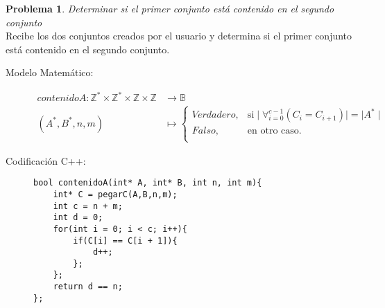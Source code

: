 \documentclass{article}
\theoremstyle{plain}
\theoremstyle{definition}
\newtheorem{problem}{Problema}
\begin{document}
\begin{problem}\emph{Determinar si el primer conjunto está contenido en el segundo conjunto}\\
Recibe los dos conjuntos creados por el usuario y determina si el primer conjunto está contenido en el segundo conjunto.
%
\begin{description}
\item[Modelo Matemático:]
%
\begin{align*}
contenidoA: \mathbb{Z}^*\times\mathbb{Z}^*\times\mathbb{Z}\times\mathbb{Z}&\to \mathbb{B}\\
(A^*,B^*,n,m) &\mapsto
\begin{cases}
Verdadero, &\text{si}\mid \forall_{i=0}^{c-1} (C_i = C_{i+1}) \mid=\mid A^* \mid \\
Falso, &\text{en otro caso}.\\
\end{cases}
\end{align*}
%
\item[Codificación \textsf{C++}:]\hfill
%
\begin{verbatim}
bool contenidoA(int* A, int* B, int n, int m){
    int* C = pegarC(A,B,n,m);
    int c = n + m;
    int d = 0;
    for(int i = 0; i < c; i++){
        if(C[i] == C[i + 1]){
            d++;
        };
    };
    return d == n;
};
\end{verbatim}
\end{description}
\end{problem}
\end{document}
